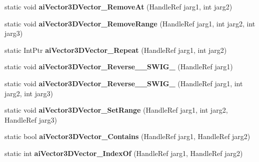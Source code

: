\begin{DoxyCompactItemize}
\item 
\hypertarget{class_assimp_p_i_n_v_o_k_e_a8f872865d2bca49d723f5e4ab78deb22}{static void {\bfseries ai\+Vector3\+D\+Vector\+\_\+\+Remove\+At} (Handle\+Ref jarg1, int jarg2)}\label{class_assimp_p_i_n_v_o_k_e_a8f872865d2bca49d723f5e4ab78deb22}

\item 
\hypertarget{class_assimp_p_i_n_v_o_k_e_ad9e6356f8dfbb7336980949e392825eb}{static void {\bfseries ai\+Vector3\+D\+Vector\+\_\+\+Remove\+Range} (Handle\+Ref jarg1, int jarg2, int jarg3)}\label{class_assimp_p_i_n_v_o_k_e_ad9e6356f8dfbb7336980949e392825eb}

\item 
\hypertarget{class_assimp_p_i_n_v_o_k_e_a0ca0c7b8a18c37a498501396b4b3bc21}{static Int\+Ptr {\bfseries ai\+Vector3\+D\+Vector\+\_\+\+Repeat} (Handle\+Ref jarg1, int jarg2)}\label{class_assimp_p_i_n_v_o_k_e_a0ca0c7b8a18c37a498501396b4b3bc21}

\item 
\hypertarget{class_assimp_p_i_n_v_o_k_e_ab2f8f5abd7e77916cc577c7cd7e2315d}{static void {\bfseries ai\+Vector3\+D\+Vector\+\_\+\+Reverse\+\_\+\+\_\+\+S\+W\+I\+G\+\_} (Handle\+Ref jarg1)}\label{class_assimp_p_i_n_v_o_k_e_ab2f8f5abd7e77916cc577c7cd7e2315d}

\item 
\hypertarget{class_assimp_p_i_n_v_o_k_e_ae19a096f96d6ded916821ad0c1f2bb95}{static void {\bfseries ai\+Vector3\+D\+Vector\+\_\+\+Reverse\+\_\+\+\_\+\+S\+W\+I\+G\+\_} (Handle\+Ref jarg1, int jarg2, int jarg3)}\label{class_assimp_p_i_n_v_o_k_e_ae19a096f96d6ded916821ad0c1f2bb95}

\item 
\hypertarget{class_assimp_p_i_n_v_o_k_e_ab7eb190cca36970105d6acd5afebd7aa}{static void {\bfseries ai\+Vector3\+D\+Vector\+\_\+\+Set\+Range} (Handle\+Ref jarg1, int jarg2, Handle\+Ref jarg3)}\label{class_assimp_p_i_n_v_o_k_e_ab7eb190cca36970105d6acd5afebd7aa}

\item 
\hypertarget{class_assimp_p_i_n_v_o_k_e_a384008a905219e7c0059357068488a6f}{static bool {\bfseries ai\+Vector3\+D\+Vector\+\_\+\+Contains} (Handle\+Ref jarg1, Handle\+Ref jarg2)}\label{class_assimp_p_i_n_v_o_k_e_a384008a905219e7c0059357068488a6f}

\item 
\hypertarget{class_assimp_p_i_n_v_o_k_e_a1bb30a6f51b1a76927e351c8fb2e373d}{static int {\bfseries ai\+Vector3\+D\+Vector\+\_\+\+Index\+Of} (Handle\+Ref jarg1, Handle\+Ref jarg2)}\label{class_assimp_p_i_n_v_o_k_e_a1bb30a6f51b1a76927e351c8fb2e373d}


\end{DoxyCompactItemize}
